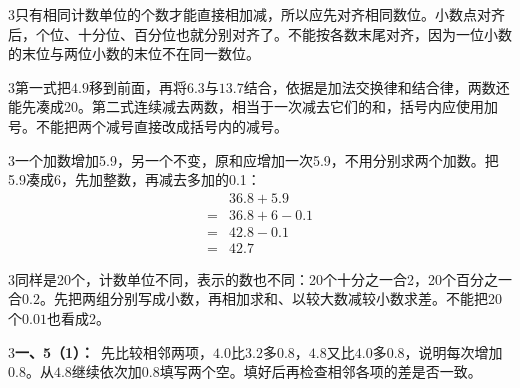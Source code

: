 \documentclass[multi=snippet,border={5bp 20bp 5bp 5bp}]{standalone}
\newenvironment{snippet}[3]{\begin{minipage}{#1bp}\color{answerred}\fontsize{#2}{#3}\selectfont\raggedright}{\end{minipage}}
\begin{document}
\begin{snippet}{505}{11.5}{14}\begin{multicols}{3}\raggedcolumns 只有相同计数单位的个数才能直接相加减，所以应先对齐相同数位。小数点对齐后，个位、十分位、百分位也就分别对齐了。不能按各数末尾对齐，因为一位小数的末位与两位小数的末位不在同一数位。\end{multicols}\end{snippet}
\begin{snippet}{505}{11.5}{14}\begin{multicols}{3}\raggedcolumns 第一式把\(4.9\)\allowbreak 移到前面，再将\(6.3\)\allowbreak 与\(13.7\)\allowbreak 结合，依据是加法交换律和结合律，两数还能先凑成20。第二式连续减去两数，相当于一次减去它们的和，括号内应使用加号。不能把两个减号直接改成括号内的减号。\end{multicols}\end{snippet}
\begin{snippet}{505}{11.5}{14}\begin{multicols}{3}\raggedcolumns 一个加数增加5.9，另一个不变，原和应增加一次5.9，不用分别求两个加数。把5.9凑成6，先加整数，再减去多加的0.1：\[\begin{aligned}&36.8+5.9\\={}&36.8+6-0.1\\={}&42.8-0.1\\={}&42.7\end{aligned}\]\end{multicols}\end{snippet}
\begin{snippet}{505}{11.5}{14}\begin{multicols}{3}\raggedcolumns 同样是20个，计数单位不同，表示的数也不同：20个十分之一合2，20个百分之一合\(0.2\)\allowbreak 。先把两组分别写成小数，再相加求和、以较大数减较小数求差。不能把20个\(0.01\)\allowbreak 也看成2。\end{multicols}\end{snippet}
\begin{snippet}{505}{11.5}{14}\begin{multicols}{3}\raggedcolumns \textbf{一、5（1）：}\ 先比较相邻两项，\(4.0\)\allowbreak 比\(3.2\)\allowbreak 多\(0.8\)\allowbreak ，\(4.8\)\allowbreak 又比\(4.0\)\allowbreak 多\(0.8\)\allowbreak ，说明每次增加\(0.8\)\allowbreak 。从\(4.8\)\allowbreak 继续依次加\(0.8\)\allowbreak 填写两个空。填好后再检查相邻各项的差是否一致。\end{multicols}\end{snippet}
\end{document}
